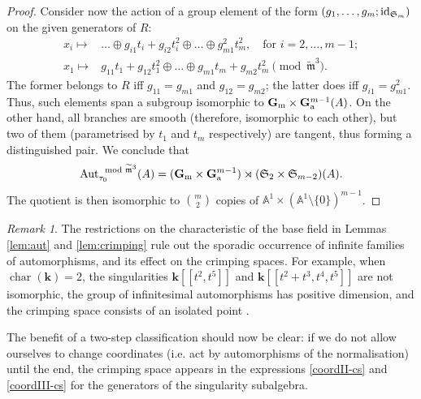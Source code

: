 \documentclass{compositio}
\renewcommand{\k}{\mathbf k}
\newcommand{\tm}{\widetilde{\mathfrak m}}
\newcommand{\Aaff}{\mathbb A}
\newcommand{\Gm}{\mathbb{G}_{\rm{m}}}
\newcommand{\Ga}{\mathbb{G}_{\rm{a}}}
\newcommand{\Aut}{\operatorname{Aut}}
\newcommand{\id}{{\rm id}}
\theoremstyle{plain}
\theoremstyle{definition}
\theoremstyle{remark}
\newtheorem{rem}[thm]{Remark}
\begin{document}
\begin{proof}
Consider now the action of a group element of the form $(g_1,\ldots,g_m;\id_{\mathfrak{S}_m})$ on the given generators of $R$:
\begin{align*}
 x_i\mapsto& \ldots\oplus g_{i1}t_i+g_{i2}t_i^2\oplus\ldots\oplus g_{m1}^2t_m^2,\quad\text{for } i=2,\ldots,m-1;\\
 x_1\mapsto& g_{11}t_1+g_{12}t_1^2\oplus\ldots\oplus g_{m1}t_m+g_{m2}t_m^2 \pmod{\tm^3}.
\end{align*}
The former belongs to $R$ iff $g_{11}=g_{m1}$ and $g_{12}=g_{m2}$; the latter does iff $g_{i1}=g_{m1}^2$. Thus, such elements span a subgroup isomorphic to $\Gm\times\Ga^{m-1}(A)$. On the other hand, all branches are smooth (therefore, isomorphic to each other), but two of them (parametrised by $t_1$ and $t_m$ respectively) are tangent, thus forming a distinguished pair. We conclude that
\[\Aut_{\tau_0}^{\mod\tm^3}(A)=(\Gm\times\Ga^{m-1})\rtimes(\mathfrak{S}_2\times\mathfrak{S}_{m-2})(A).\]
The quotient is then isomorphic to $\binom{m}{2}$ copies of $\Aaff^1\times(\Aaff^1\setminus\{0\})^{m-1}$.
\end{proof}


\begin{rem}
 The restrictions on the characteristic of the base field in Lemmas \ref{lem:aut} and \ref{lem:crimping} rule out the sporadic occurrence of infinite families of automorphisms, and its effect on the crimping spaces. For example, when $\operatorname{char}(\k)=2$, the singularities $\k[\![t^2,t^5]\!]$ and $\k[\![t^2+t^3,t^4,t^5]\!]$ are not isomorphic, the group of infinitesimal automorphisms has positive dimension, and the crimping space consists of an isolated point \cite[Examples 1.79-80]{vdW}.
\end{rem}

The benefit of a two-step classification should now be clear: if we do not allow ourselves to change coordinates (i.e. act by automorphisms of the normalisation) until the end, the crimping space appears in the expressions \eqref{coordII-cs} and \eqref{coordIII-cs} for the generators of the singularity subalgebra.
\end{document}

